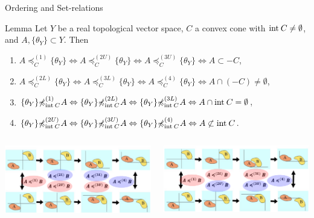 \documentclass[aspectratio=169, dvipdfmx, 11pt]{beamer}
\newcommand{\Interior}[1]{\text{\rm int\:${#1}$}} %
\newcommand{\setrel}[2]{\preccurlyeq^{(#1)}_{#2}\!}
\newcommand{\notsetrel}[2]{{\not\preccurlyeq}^{(#1)}_{#2}\!}
\begin{document}
\begin{frame}{Ordering and Set-relations}
  \begin{block}{Lemma}
    Let $Y$ be a real topological vector space, $C$ a convex cone
    with $\Interior{C} \ne \emptyset$, and $A, \{\theta_Y\} \subset Y$. Then
    \begin{enumerate}
      \item $A \setrel{1}{C} \{\theta_Y\} \Leftrightarrow A \setrel{2U}{C} \{\theta_Y\} \Leftrightarrow A \setrel{3U}{C} \{\theta_Y\} \Leftrightarrow A \subset -C$,
      \item $A \setrel{2L}{C} \{\theta_Y\} \Leftrightarrow A \setrel{3L}{C} \{\theta_Y\} \Leftrightarrow A \setrel{4}{C} \{\theta_Y\} \Leftrightarrow A \cap (-C) \ne \emptyset$,
      \item $\{\theta_Y\} \notsetrel{1}{\Interior{C}}\:A \Leftrightarrow \{\theta_Y\} \notsetrel{2L}{\Interior{C}}\:A \Leftrightarrow \{\theta_Y\} \notsetrel{3L}{\Interior{C}}\:A \Leftrightarrow A \cap \Interior{C} = \emptyset$,
      \item $\{\theta_Y\} \notsetrel{2U}{\Interior{C}}\:A \Leftrightarrow \{\theta_Y\} \notsetrel{3U}{\Interior{C}}\:A \Leftrightarrow \{\theta_Y\} \notsetrel{4}{\Interior{C}}\:A \Leftrightarrow A \not\subset \Interior{C}$.
    \end{enumerate}
  \end{block}
  \centering
  \begin{columns}
    \begin{column}{0.48\textwidth}
      \centering
      \includegraphics[keepaspectratio, scale=0.18]{figures/eps/case2_set_relations.eps}
    \end{column}
    \begin{column}{0.48\textwidth}
      \centering
      \includegraphics[keepaspectratio, scale=0.18]{figures/eps/case1_set_relations.eps}
    \end{column}
  \end{columns}
\end{frame}
\end{document}
